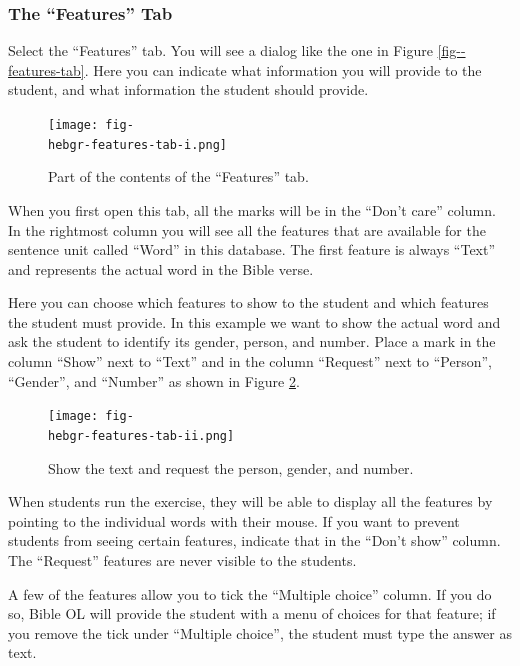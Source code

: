 \documentclass[11pt,oneside,a4paper]{memoir}
\newcommand{\hebgr}{}   %
\begin{document}
{\subsubsection{The ``Features'' Tab}

Select the ``Features'' tab. You will see a dialog like the one in Figure
\ref{fig-\hebgr-features-tab}. Here you can indicate what information you will provide to the
student, and what information the student should provide.

\begin{figure}
  \begin{center}
    \texttt{[image: fig-\\hebgr-features-tab-i.png]}
  \end{center}
  \caption{Part of the contents of the ``Features'' tab.}\label{fig-\hebgr-features-tab-i}
\end{figure}

When you first open this tab, all the marks will be in the ``Don’t care'' column. In the rightmost
column you will see all the features that are available for the sentence unit called ``Word'' in
this database. The first feature is always ``Text'' and represents the actual word in the Bible
verse.

Here you can choose which features to show to the student and which features the student must
provide. In this example we want to show the actual word and ask the student to identify its gender,
person, and number. Place a mark in the column ``Show'' next to ``Text'' and in the column
``Request'' next to ``Person'', ``Gender'', and ``Number'' as shown in Figure \ref{fig-\hebgr-features-tab-ii}.

\begin{figure}
  \begin{center}
    \texttt{[image: fig-\\hebgr-features-tab-ii.png]}
  \end{center}
  \caption{Show the text and request the person, gender, and number.}\label{fig-\hebgr-features-tab-ii}
\end{figure}


When students run the exercise, they will be able to display all the features by pointing to the
individual words with their mouse. If you want to prevent students from seeing certain features,
indicate that in the ``Don’t show'' column. The ``Request'' features are never visible to the
students.

A few of the features allow you to tick the ``Multiple choice'' column. If you do so, Bible OL will
provide the student with a menu of choices for that feature; if you remove the tick under ``Multiple
choice'', the student must type the answer as text.

}
\end{document}

